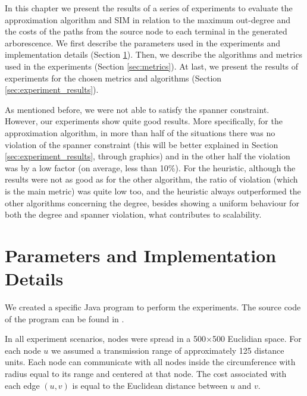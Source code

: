 \label{sec:evaluation}
\acresetall

In this chapter we present the results of a series of experiments to evaluate the approximation algorithm and SIM in relation to the 
maximum out-degree and the costs of the paths from the source node to each terminal in the generated arborescence. 
We first describe the parameters used in the experiments and implementation details (Section \ref{sec:parameters}). 
Then, we describe the algorithms and metrics 
used in the experiments (Section \ref{sec:metrics}). At last, we present the results of experiments for the chosen metrics and algorithms (Section \ref{sec:experiment_results}).

As mentioned before, we were not able to satisfy the spanner constraint. However, our experiments show quite good results. 
More specifically, for the approximation algorithm, in more than half of the situations there was no violation of the spanner constraint (this will be better 
explained in Section \ref{sec:experiment_results}, through graphics) and in the other half the violation was by a low factor (on average, less than 10\%). 
For the heuristic, although the results were not as good as for the other algorithm, the ratio of violation (which is the main metric) was quite low too, 
and the heuristic always outperformed the other algorithms concerning the degree, besides showing a uniform behaviour for both the degree and spanner violation, 
what contributes to scalability.

\section{Parameters and Implementation Details}
\label{sec:parameters}
We created a specific Java program to perform the experiments. The source code of the program can be found in \cite{DSMDStPLink2012}. 

In all experiment scenarios, nodes were spread in a 500$\times$500 Euclidian space. 
For each node $u$ we assumed a transmission range of approximately 125 distance units. 
Each node can communicate with all nodes inside the circumference with radius equal to its range and centered at that node.
The cost associated with each edge $(u, v)$ is equal to the Euclidean distance between $u$ and $v$.

